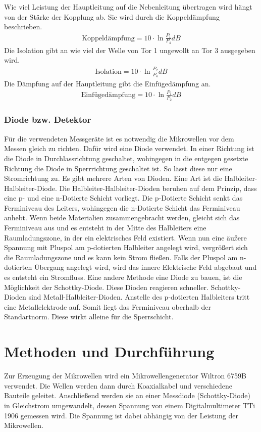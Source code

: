 Wie viel Leistung der Hauptleitung auf die Nebenleitung übertragen wird hängt von der Stärke der Kopplung ab. Sie wird durch die Koppeldämpfung beschrieben.
\begin{align}
	\text{Koppeldämpfung} = 10\cdot \ln{\frac{P_1}{P_4}}dB
	\label{KppF}
\end{align}
Die Isolation gibt an wie viel der Welle von Tor 1 ungewollt an Tor 3 ausgegeben wird.
\begin{align}
	\text{Isolation} = 10\cdot \ln{\frac{P_2}{P_4}}dB
	\label{IsoF}
\end{align}
Die Dämpfung auf der Hauptleitung gibt die Einfügedämpfung an. 
\begin{align}
	\text{Einfügedämpfung} = 10\cdot \ln{\frac{P_1}{P_2}}dB
	\label{EinF}
\end{align}


\subsubsection{Diode bzw. Detektor}
Für die verwendeten Messgeräte ist es notwendig die Mikrowellen vor dem Messen gleich zu richten. Dafür wird eine Diode verwendet. In einer Richtung ist die Diode in Durchlassrichtung geschaltet, wohingegen in die entgegen gesetzte Richtung die Diode in Sperrrichtung geschaltet ist. So lässt diese nur eine Stromrichtung zu.
Es gibt mehrere Arten von Dioden. Eine Art ist die Halbleiter-Halbleiter-Diode.
Die Halbleiter-Halbleiter-Dioden beruhen auf dem Prinzip, dass eine p- und eine n-Dotierte Schicht vorliegt. Die p-Dotierte Schicht senkt das Ferminiveau des Leiters, wohingegen die n-Dotierte Schicht das Ferminiveau anhebt. Wenn beide Materialien zusammengebracht werden, gleicht sich das Ferminiveau aus und es entsteht in der Mitte des Halbleiters eine Raumladungszone, in der ein elektrisches Feld existiert. Wenn nun eine äußere Spannung mit Pluspol am p-dotierten Halbleiter angelegt wird, vergrößert sich die Raumladungszone und es kann kein Strom fließen. Falls der Pluspol am n-dotierten Übergang angelegt wird, wird das innere Elektrische Feld abgebaut und es entsteht ein Stromfluss.
Eine andere Methode eine Diode zu bauen, ist die Möglichkeit der Schottky-Diode. Diese Dioden reagieren schneller. Schottky-Dioden sind Metall-Halbleiter-Dioden. Anstelle des p-dotierten Halbleiters tritt eine Metallelektrode auf. Somit liegt das Ferminiveau oberhalb der Standartnorm. Diese wirkt alleine für die Sperrschicht. 


\section{Methoden und Durchführung}
Zur Erzeugung der Mikrowellen wird ein Mikrowellengenerator Wiltron 6759B verwendet. Die Wellen werden dann durch Koaxialkabel und verschiedene Bauteile geleitet. Anschließend werden sie an einer Messdiode (Schottky-Diode) in Gleichstrom umgewandelt, dessen Spannung von einem Digitalmultimeter TTi 1906 gemessen wird. Die Spannung ist dabei abhängig von der Leistung der Mikrowellen.
